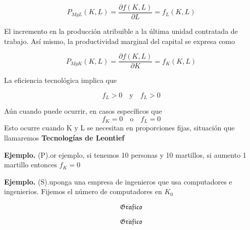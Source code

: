 \documentclass{report}
\newcommand{\GRAF}{\begin{center}$$\mathfrak{Gr\acute{a}fico}$$\end{center}}
\newenvironment{example}[1]{\noindent\setlength{\parskip}{0pt}\textbf{Ejemplo.} (#1).}{}
\begin{document}
\[
P_{MgL}\!\left( K,L \right) = \frac{\partial f\!\left( K,L \right) }{\partial L}  = f_{L}\!\left( K,L \right) 
\] 

El incremento en la producción atribuible a la última unidad contratada de trabajo. Así mismo, la productividad marginal del capital se expresa como

\[
P_{MgK}\!\left( K,L \right) = \frac{\partial f\!\left( K,L \right) }{\partial K} = f_{K}\!\left( K,L \right) 
\] 

La eficiencia tecnológica implica que 

\[
f_L > 0 \quad \text{y} \quad f_L > 0
\] 

Aún cuando puede ocurrir, en casos específicos que
\[
f_K = 0 \quad \text{o} \quad f_L = 0
\] 
Esto ocurre cuando K y L se necesitan en proporciones fijas, situación que llamaremos \bf{Tecnologías de Leontief}

\begin{example}
Por ejemplo, si tenemos 10 personas y 10 martillos, si aumento 1 martillo entonces $f_K=0$
\end{example}

\begin{example}
    Suponga una empresa de ingenieros que usa computadores e ingenierios. Fijemos el número de computadores en $K_0$
    \GRAF
    \GRAF
\end{example}










\end{document}
